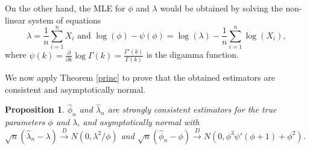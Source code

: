 \documentclass[12pt]{article} %
\newtheorem{proposition}{Proposition}
\theoremstyle{definition}
\begin{document}
On the other hand, the MLE for $\phi$ and $\lambda$ would be obtained by solving the non-linear system of equations
\begin{equation}\label{verogg23}
\lambda=\frac{1}{n}\sum_{i=1}^n X_i\mbox{ and }\log(\phi)-\psi(\phi)=\log(\lambda)-\frac{1}{n}\sum_{i=1}^n{\log\left(X_i\right)}, 
 \end{equation}
where $\psi(k)=\frac{\partial}{\partial k}\log\Gamma(k)=\frac{\Gamma'(k)}{\Gamma(k)}$ is the digamma function.

We now apply Theorem \ref{princ} to prove that the obtained estimators are consistent and asymptotically normal.

\begin{proposition}\label{proofgamma} $\hat\phi_n$ and $\hat\lambda_n$ are strongly consistent estimators for the true parameters $\phi$ and $\lambda$, and asymptotically normal with $\sqrt{n}\left(\hat{\lambda}_n-\lambda\right)\overset{D}{\to} N\left(0,\lambda^2/\phi\right)$ and $\sqrt{n}\left(\hat{\phi}_n-\phi\right)\overset{D}{\to} N\left(0,\phi^3\psi'(\phi+1)+\phi^2\right)$.
\end{proposition}
\end{document}
